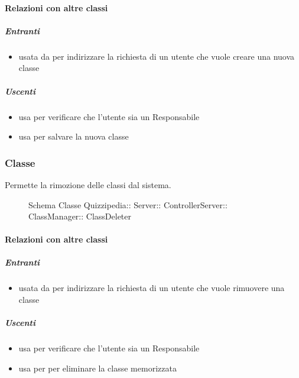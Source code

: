 \paragraph{Relazioni con altre classi}
\subparagraph{Entranti}
\begin{itemize}
\item usata da  per indirizzare la richiesta di un utente che vuole creare una nuova classe
\end{itemize}
\subparagraph{Uscenti}
\begin{itemize}
\item usa  per verificare che l'utente sia un Responsabile
\item usa  per salvare la nuova classe
\end{itemize}
\subsubsection{Classe }
Permette la rimozione delle classi dal sistema.
\begin{figure}[H]
\centering
\noindent{}
\caption[Schema Classe ClassDeleter]{Schema Classe Quizzipedia:: Server:: ControllerServer:: ClassManager:: ClassDeleter}
\end{figure}
\paragraph{Relazioni con altre classi}
\subparagraph{Entranti}
\begin{itemize}
\item usata da  per indirizzare la richiesta di un utente che vuole rimuovere una classe
\end{itemize}
\subparagraph{Uscenti}
\begin{itemize}
\item usa  per verificare che l'utente sia un Responsabile
\item usa  per per eliminare la classe memorizzata
\end{itemize}

